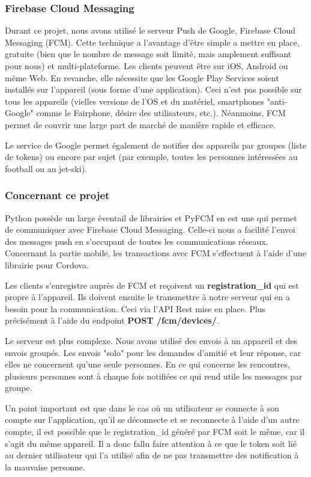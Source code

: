 \documentclass[french]{article}
\begin{document}
	\subsubsection{Firebase Cloud Messaging}
	
	Durant ce projet, nous avons utilisé le serveur Push de Google, Firebase Cloud Messaging (FCM). Cette technique a l'avantage d'être simple a mettre en place, gratuite (bien que le nombre de message soit limité, mais amplement suffisant pour nous) et multi-plateforme. Les clients peuvent être sur iOS, Android ou même Web.
	En revanche, elle nécessite que les Google Play Services soient installés sur l'appareil (sous forme d'une application). Ceci n'est pas possible sur tous les appareils (vielles versions de l'OS et du matériel, smartphones "anti-Google" comme le Fairphone, désire des utilisateurs, etc.).
	Néanmoins, FCM permet de couvrir une large part de marché de manière rapide et efficace.
	
	Le service de Google permet également de notifier des appareils par groupes (liste de tokens) ou encore par sujet (par exemple, toutes les personnes intéressées au football ou au jet-ski).
	
	\subsubsection{Concernant ce projet}
	
	Python possède un large éventail de librairies et PyFCM en est une qui permet de communiquer avec Firebase Cloud Messaging. Celle-ci nous a facilité l'envoi des messages push en s'occupant de toutes les communications réseaux. Concernant la partie mobile, les transactions avec FCM s'effectuent à l'aide d'une librairie pour Cordova.
	
	Les clients s'enregistre auprès de FCM et reçoivent un \textbf{registration\_id} qui est propre à l'appareil. Ils doivent ensuite le transmettre à notre serveur qui en a besoin pour la communication. Ceci via l'API Rest mise en place. Plus précisément à l'aide du endpoint \textbf{POST /fcm/devices/}.
	
	Le serveur est plus complexe. Nous avons utilisé des envois à un appareil et des envois groupés. Les envois "solo" pour les demandes d'amitié et leur réponse, car elles ne concernent qu'une seule personnes. En ce qui concerne les rencontres, plusieurs personnes sont à chaque fois notifiées ce qui rend utile les messages par groupe.
	
	Un point important est que dans le cas où un utilisateur se connecte à son compte sur l'application, qu'il se déconnecte et se reconnecte à l'aide d'un autre compte, il est possible que le registration\_id généré par FCM soit le même, car il s'agit du même appareil. Il a donc fallu faire attention à ce que le token soit lié au dernier utilisateur qui l'a utilisé afin de ne pas transmettre des notification à la mauvaise personne.
	
\end{document}
